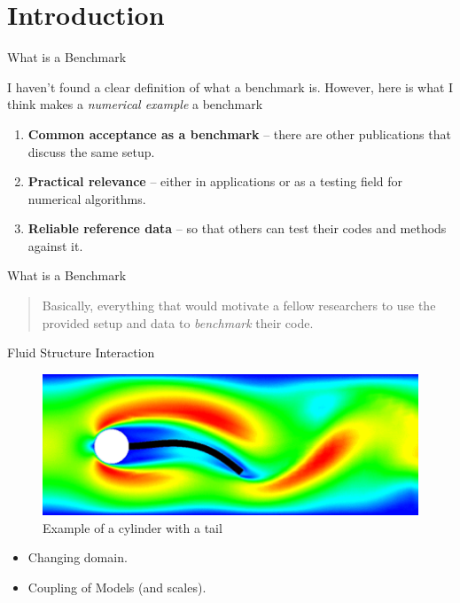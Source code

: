 \section{Introduction}\label{introduction}

\begin{frame}{What is a Benchmark}

I haven't found a clear definition of what a benchmark is. However, here
is what I think makes a \emph{numerical example} a benchmark

\begin{enumerate}
\def\labelenumi{\arabic{enumi}.}
\tightlist
\item
  \textbf{Common acceptance as a benchmark} -- there are other
  publications that discuss the same setup.
\item
  \textbf{Practical relevance} -- either in applications or as a testing
  field for numerical algorithms.
\item
  \textbf{Reliable reference data} -- so that others can test their
  codes and methods against it.
\end{enumerate}

\end{frame}

\begin{frame}{What is a Benchmark}

\begin{quote}
Basically, everything that would motivate a fellow researchers to use
the provided setup and data to \emph{benchmark} their code.
\end{quote}

\end{frame}

\begin{frame}{Fluid Structure Interaction}

\begin{figure}
\centering
\includegraphics{pics/fsi2.gif}
\caption{Example of a cylinder with a tail}
\end{figure}

\begin{itemize}
\tightlist
\item
  Changing domain.
\item
  Coupling of Models (and scales).
\end{itemize}

\end{frame}

